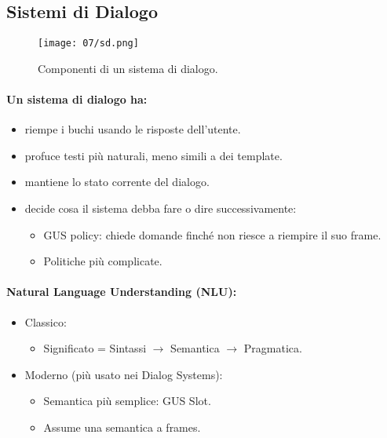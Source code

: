 \subsection{Sistemi di Dialogo}

\begin{figure}[h]
    \centering
    \texttt{[image: 07/sd.png]}
    \caption{Componenti di un sistema di dialogo.}
\end{figure}

\paragraph{Un sistema di dialogo ha:}

\begin{itemize}
  \item {} riempe i buchi usando le risposte dell'utente.
  \item {} profuce testi più naturali, meno simili a dei template. 
  \item {} mantiene lo stato corrente del dialogo.
  \item {} decide cosa il sistema debba fare o dire successivamente: 
    \begin{itemize}
      \item GUS policy: chiede domande finché non riesce a riempire il suo frame. 
      \item Politiche più complicate.
    \end{itemize}
\end{itemize}

\paragraph{Natural Language Understanding (NLU):}

\begin{itemize}
  \item Classico: 
    \begin{itemize}
      \item Significato = Sintassi $\rightarrow$ Semantica $\rightarrow$ Pragmatica.
    \end{itemize}
  \item Moderno (più usato nei Dialog Systems): 
    \begin{itemize}
      \item Semantica più semplice: GUS Slot. 
      \item Assume una semantica a frames.
    \end{itemize}
\end{itemize}

